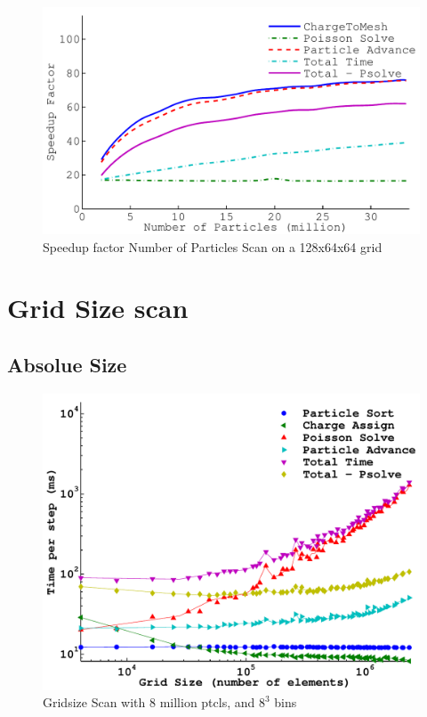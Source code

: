 \begin{figure}[h]
\begin{center}
\includegraphics[width=6in]{performance/nptclspeedup_scan128x64x64ons8bins.pdf}
\end{center}
\caption{Speedup factor Number of Particles Scan on a 128x64x64 grid}
\label{fig:nptclsize_scan_speedup}
\end{figure}


	
	\section{Grid Size scan}
		\subsection{Absolue Size}
\begin{figure}[h]
\begin{center}
\includegraphics[width=6in]{performance/gridsize_scan8ptcls8bins.pdf}
\end{center}
\caption{Gridsize Scan with 8 million ptcls, and $8^3$ bins}
\label{fig:nptclsize_scan128x64x64}
\end{figure}


